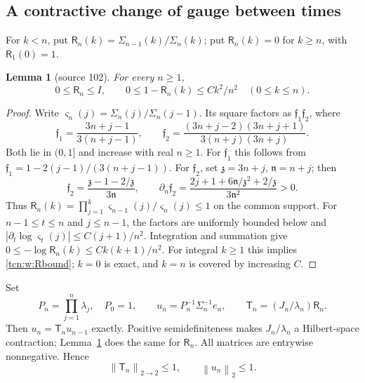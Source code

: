 \documentclass[11pt,letterpaper]{article}
\newcommand{\norm}[1]{\left\lVert#1\right\rVert}
\newtheorem{lemma}[theorem]{Lemma}
\theoremstyle{remark}
\begin{document}
\subsection{A contractive change of gauge between times}
For $k<n$, put $\mathsf R_n(k)=\Sigma_{n-1}(k)/\Sigma_n(k)$; put $\mathsf R_n(k)=0$ for $k\ge n$, with $\mathsf R_1(0)=1$.
\begin{lemma}[source 102]\label{tcn:w:lem:R}
For every $n\ge1$,
\begin{equation}\label{tcn:w:Rbound}
 0\le \mathsf R_n\le I,\qquad 0\le1-\mathsf R_n(k)\le Ck^2/n^2\quad(0\le k\le n).
\end{equation}
\end{lemma}
\begin{proof}
Write $\varsigma_n(j)=\Sigma_n(j)/\Sigma_n(j-1)$. Its square factors as $\mathfrak f_1\mathfrak f_2$, where
\[
 \mathfrak f_1=\frac{3n+j-1}{3(n+j-1)},\qquad
 \mathfrak f_2=\frac{(3n+j-2)(3n+j+1)}{3(n+j)(3n+j)}.
\]
Both lie in $(0,1]$ and increase with real $n\ge1$. For $\mathfrak f_1$ this follows from
$\mathfrak f_1=1-2(j-1)/(3(n+j-1))$. For $\mathfrak f_2$, set $\mathfrak z=3n+j$, $\mathfrak n=n+j$; then
\[
 \mathfrak f_2=\frac{\mathfrak z-1-2/\mathfrak z}{3\mathfrak n},\qquad
 \partial_n\mathfrak f_2=\frac{2j+1+6\mathfrak n/\mathfrak z^2+2/\mathfrak z}{3\mathfrak n^2}>0.
\]
Thus $\mathsf R_n(k)=\prod_{j=1}^k \varsigma_{n-1}(j)/\varsigma_n(j)\le1$ on the common support.
For $n-1\le t\le n$ and $j\le n-1$, the factors are uniformly bounded below and
$|\partial_t\log \varsigma_t(j)|\le C(j+1)/n^2$. Integration and summation give
$0\le-\log \mathsf R_n(k)\le Ck(k+1)/n^2$. For integral $k\ge1$ this implies \eqref{tcn:w:Rbound}; $k=0$ is exact, and $k=n$ is covered by increasing $C$.
\end{proof}
Set
\begin{equation}\label{tcn:w:T}
 P_n=\prod_{j=1}^n\lambda_j,\quad P_0=1,\qquad
 u_n=P_n^{-1}\Sigma_n^{-1}e_n,\qquad
 \mathsf T_n=(J_n/\lambda_n)\mathsf R_n.
\end{equation}
Then $u_n=\mathsf T_nu_{n-1}$ exactly. Positive semidefiniteness makes $J_n/\lambda_n$ a Hilbert-space contraction; Lemma~\ref{tcn:w:lem:R} does the same for $\mathsf R_n$. All matrices are entrywise nonnegative. Hence
\begin{equation}\label{tcn:w:contract}
 \norm{\mathsf T_n}_{2\to2}\le1,\qquad\norm{u_n}_2\le1.
\end{equation}
\end{document}
